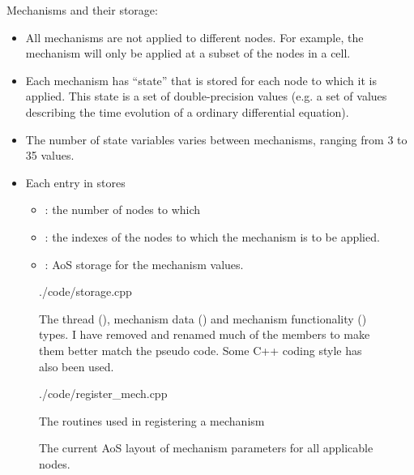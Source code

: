 \noindent
Mechanisms and their storage:
\begin{itemize}
\item
    All mechanisms are not applied to different nodes. For example, the  mechanism will only be applied at a subset of the nodes in a cell.
\item
    Each mechanism has ``state'' that is stored for each node to which it is applied. This state is a set of double-precision values (e.g. a set of values describing the time evolution of a ordinary differential equation).
\item
    The number of state variables varies between mechanisms, ranging from 3 to 35 values.
\item
    Each entry in  stores 
    \begin{itemize}
    \item
        : the number of nodes to which
    \item
        : the indexes of the nodes to which the mechanism is to be applied.
    \item
        : AoS storage for the mechanism  values.
    \end{itemize}
\end{itemize}


\begin{figure}
\begin{shaded}
 {./code/storage.cpp}
\end{shaded}
\label{lst:NrnThreadInfo}
\caption{The thread (), mechanism data () and mechanism functionality () types. I have removed and renamed much of the members to make them better match the pseudo code. Some C++ coding style has also been used.}
\end{figure}

\begin{figure}
\begin{shaded}
 {./code/register_mech.cpp}
\end{shaded}
\label{lst:register_mech}
\caption{The routines used in registering a mechanism}
\end{figure}

\begin{figure}[htp!]

\caption{The current AoS layout of mechanism parameters for all applicable nodes.}
\end{figure}

